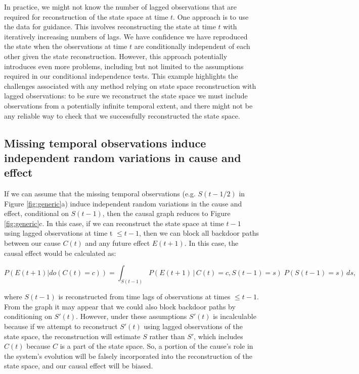 \documentclass[12pt]{article}
\begin{document}
In practice, we might not know the number of lagged observations that
are required for reconstruction of the state space at time $t$. One
approach is to use the data for guidance. This involves reconstructing
the state at time $t$ with iteratively increasing numbers of lags. We
have confidence we have reproduced the state when the observations at
time $t$ are conditionally independent of each other given the state
reconstruction. However, this approach potentially introduces even
more problems, including but not limited to the assumptions required
in our conditional independence tests. This example highlights the
challenges associated with any method relying on state space
reconstruction with lagged observations: to be sure we reconstruct the
state space we must include observations from a potentially infinite
temporal extent, and there might not be any reliable way to check that
we successfully reconstructed the state space.

\subsection{Missing temporal observations induce independent random
  variations in cause and effect}
\label{sec:miss-temp-observ}

If we can assume that the missing temporal observations
(e.g. $S(t-1/2)$ in Figure \ref{fig:generic}a) induce independent
random variations in the cause and effect, conditional on $S(t-1)$,
then the causal graph reduces to Figure \ref{fig:generic}c. In this
case, if we can reconstruct the state space at time $t-1$ using lagged
observations at time t $\leq t-1$, then we can block all backdoor
paths between our cause $C(t)$ and any future effect $E(t+1)$. In this
case, the causal effect would be calculated as:

\begin{equation} P(E(t+1)| do(C(t)=c)) = \int_{S(t-1)} P(E(t+1) \, |
  \, C(t)=c, S(t-1) = s )\; P(S(t-1)=s) \, d s,
\end{equation}

where $S(t-1)$ is reconstructed from time lags of observations at
times $\leq t-1$. From the graph it may appear that we could also
block backdoor paths by conditioning on $S'(t)$. However, under these
assumptions $S'(t)$ is incalculable because if we attempt to
reconstruct $S'(t)$ using lagged observations of the state space, the
reconstruction will estimate $S$ rather than $S'$, which includes
$C(t)$ because $C$ is a part of the state space. So, a portion of the
cause's role in the system's evolution will be falsely incorporated
into the reconstruction of the state space, and our causal effect will
be biased.
\end{document}
